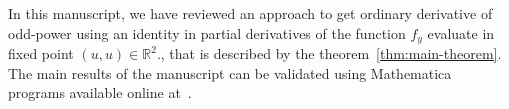In this manuscript, we have reviewed an approach to get ordinary derivative of odd-power
using an identity in partial derivatives of the function $f_y$ evaluate in fixed point $(u,u) \in \mathbb{R}^2.$,
that is described by the theorem~\ref{thm:main-theorem}.
The main results of the manuscript can be validated
using Mathematica programs available online at~\cite{kolosov2022another}.